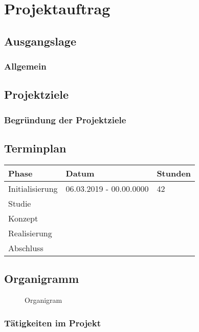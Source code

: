 \chapter{Projektauftrag}

\label{AppendixB}

\section{Ausgangslage}\label{ausgangslage}

\subsection{Allgemein}\label{allgemein}

\section{Projektziele}\label{projektziele}

\subsection{Begründung der
Projektziele}\label{begruxfcndung-der-projektziele}

\section{Terminplan}\label{terminplan}

\begin{longtable}[]{@{}lll@{}}
\toprule
Phase & Datum & Stunden\tabularnewline
\midrule
\endhead
Initialisierung & 06.03.2019 - 00.00.0000 & 42\tabularnewline
Studie & &\tabularnewline
Konzept & &\tabularnewline
Realisierung & &\tabularnewline
Abschluss & &\tabularnewline
\bottomrule
\end{longtable}

\section{Organigramm}\label{organigramm}

\begin{figure}
  \centering
  \def\svgwidth{\columnwidth}
  
  \caption{Organigram}
\end{figure}

\subsection{Tätigkeiten im Projekt}\label{tuxe4tigkeiten-im-projekt}

